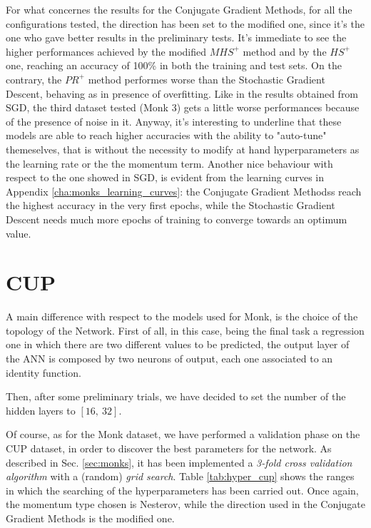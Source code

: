         For what concernes the results for the Conjugate Gradient Methods, for all the configurations tested,
        the direction has been set to the modified one, since it's the one who gave better results in the
        preliminary tests. It's immediate to see the higher performances achieved by the modified $MHS^+$ method
        and by the $HS^+$ one, reaching an accuracy of 100\% in both
        the training and test sets. On the contrary, the $PR^+$ method performes worse than the Stochastic
        Gradient Descent, behaving as in presence of overfitting. Like in the results obtained from SGD, the third
        dataset tested (Monk 3) gets a little worse performances because of the presence of noise in it.
        Anyway, it's interesting to underline that these models are able to reach higher accuracies with the
        ability to "auto-tune" themeselves, that is without the necessity to modify at hand hyperparameters as the
        learning rate or the the momentum term.
        Another nice behaviour with respect to the one showed in SGD, is evident from the learning curves in
        Appendix \ref{cha:monks_learning_curves}: the Conjugate Gradient Methodss reach the highest accuracy in
        the very first epochs, while the Stochastic Gradient Descent needs much more epochs of training to converge
        towards an optimum value.


    \section{CUP} %
        \label{sec:cup}

        A main difference with respect to the models used for Monk, is the choice of the topology of the Network.
        First of all, in this case, being the final task a regression one in which there are two different values to be predicted, the output layer of the ANN is composed by two neurons of output, each one associated to an identity function.

        Then, after some preliminary trials, we have decided to set the number of the hidden layers to $[16,\ 32]$.

        Of course, as for the Monk dataset, we have performed a validation phase on the CUP dataset, in order to
        discover the best parameters for the network. As described in Sec. \ref{sec:monks}, it has been
        implemented a \textit{3-fold cross validation algorithm} with a (random) \textit{grid search}.
        Table \ref{tab:hyper_cup} shows the ranges in which the searching of the hyperparameters has been carried
        out. Once again, the momentum type chosen is Nesterov, while the direction used in the Conjugate Gradient
        Methods is the modified one.

